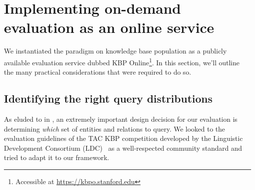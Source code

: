 \section{\label{sec:kbpo:kbpo} Implementing on-demand evaluation as an online service}



We instantiated the paradigm on knowledge base population as a publicly available evaluation service dubbed KBP Online\footnote{Accessible at \url{https://kbpo.stanford.edu}}. 
In this section, we'll outline the many practical considerations that were required to do so.

\subsection{Identifying the right query distributions}
As eluded to in , an extremely important design decision for our evaluation is determining \textit{which} set of entities and relations to query.
We looked to the evaluation guidelines of the TAC KBP competition developed by the Linguistic Development Consortium (LDC)~\citep{ellis2015tackbp,mayfield2012evaluating} as a well-respected community standard and tried to adapt it to our framework.

